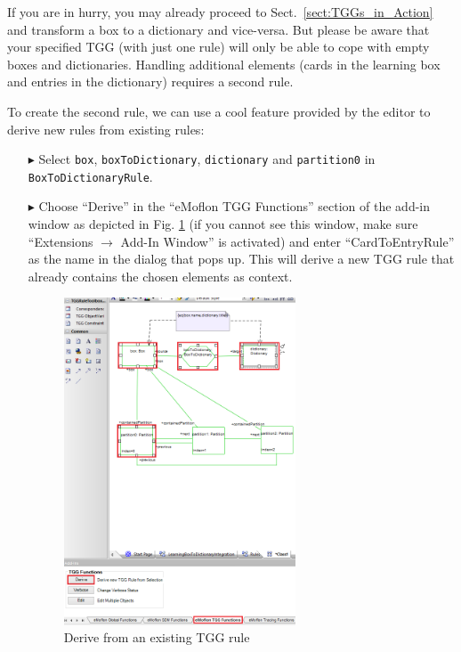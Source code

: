 If you are in hurry, you may already proceed to Sect.~\ref{sect:TGGs_in_Action} and transform a box to a dictionary and vice-versa.
But please be aware that your specified TGG (with just one rule) will only be able to cope with empty boxes and dictionaries.
Handling additional elements (cards in the learning box and entries in the dictionary) requires a second rule.

To create the second rule, we can use a cool feature provided by the editor to derive new rules from existing
rules:

\begin{enumerate}
  \item[$\blacktriangleright$] Select \texttt{box}, \texttt{boxToDictionary}, \texttt{dictionary} and \texttt{partition0} in \texttt{Box\-To\-Dictionary\-Rule}.
  \item[$\blacktriangleright$] Choose ``Derive'' in the ``eMoflon TGG Functions'' section of the add-in window 
  as depicted in Fig. \ref{fig:derive_from_tgg_rule} (if you cannot see this window, make 
  sure ``Extensions $\rightarrow$ Add-In Window'' is activated) and enter ``CardToEntryRule'' as the 
  name in the dialog that pops up. 
  This will derive a new TGG rule that already contains the chosen elements as context.

  \begin{figure}[htbp]
  \begin{center}
    \includegraphics[width=0.65\textwidth]{pics/tggBilder/tggRule/derive_tgg_rule.png}
    \caption{Derive from an existing TGG rule}
    \label{fig:derive_from_tgg_rule}
  \end{center}
  \end{figure}
  \FloatBarrier


\end{enumerate}
